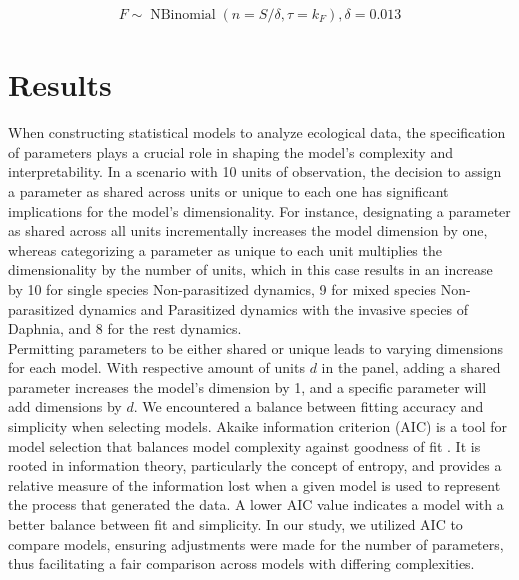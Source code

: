 \documentclass[12pt]{article}
\begin{document}
\begin{align}
F \sim \operatorname{NBinomial}(n=S / \delta, \tau = k_F), \delta=0.013 
\end{align}

\section{Results}
\label{sec:res}
When constructing statistical models to analyze ecological data, the specification of parameters plays a crucial role in shaping the model's complexity and interpretability. In a scenario with 10 units of observation, the decision to assign a parameter as shared across units or unique to each one has significant implications for the model's dimensionality. For instance, designating a parameter as shared across all units incrementally increases the model dimension by one, whereas categorizing a parameter as unique to each unit multiplies the dimensionality by the number of units, which in this case results in an increase by 10 for single species Non-parasitized dynamics, 9 for mixed species Non-parasitized dynamics and Parasitized dynamics with the invasive species of Daphnia, and 8 for the rest dynamics.\\

Permitting parameters to be either shared or unique leads to varying dimensions for each model. With respective amount of units $d$ in the panel, adding a shared parameter increases the model's dimension by 1, and a specific parameter will add dimensions by $d$. We encountered a balance between fitting accuracy and simplicity when selecting models. Akaike information criterion (AIC) is a tool for model selection that balances model complexity against goodness of fit \cite{bozdogan1987model}. It is rooted in information theory, particularly the concept of entropy, and provides a relative measure of the information lost when a given model is used to represent the process that generated the data. A lower AIC value indicates a model with a better balance between fit and simplicity. In our study, we utilized AIC to compare models, ensuring adjustments were made for the number of parameters, thus facilitating a fair comparison across models with differing complexities.\\
\end{document}
